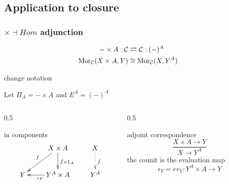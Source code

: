 \subsection{Application to closure}
\begin{frame}[t]
\frametitle{$\times \dashv Hom$ adjunction}
\begin{block}{}
\abovedisplayskip=0pt
\begin{align*}
- \times A: \mathcal{C} & \rightleftarrows \mathcal{C}: (-)^A\\
\mathop{\rm Mor}\nolimits_{\mathcal{C}}(X \times A, Y) & \cong  \mathop{\rm Mor}\nolimits_{\mathcal{C}}(X, Y^A)
\end{align*}
\end{block}
\begin{block}{change notation}
	\begin{center}
	Let $\Pi_A = - \times A$ and $E^A = (-)^A$
	\end{center}
\end{block}
\begin{columns}[t]
    \begin{column}{0.5\framewidth}
\begin{block}{in components}
			$$
			\xymatrix{
			& X \times A \ar[d]^{\bar{f} \times 1_A} \ar[dl]_{f} & X \ar@{.>}[d]^{\bar{f}}\\
			Y & Y^A \times A \ar[l]^{\epsilon_Y} & Y^A}
			$$
		\end{block}
    \end{column}
    \begin{column}{0.5\framewidth}
		\begin{block}{adjoint correspondence}
		\abovedisplayskip=0pt
		$$
			\frac{X \times A \longrightarrow Y}{X \longrightarrow Y^A}
		$$
		the counit is the evaluation map
		$$
			\epsilon_Y = ev_Y \colon Y^A \times A \longrightarrow Y
		$$
		\end{block}		
    \end{column}
\end{columns}
\end{frame}